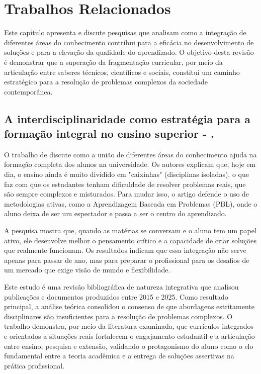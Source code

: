 \chapter{Trabalhos Relacionados}
\label{cap:trabalhos-relacionados}

Este capítulo apresenta e discute pesquisas que analisam como a integração de
diferentes áreas do conhecimento contribui para a eficácia no desenvolvimento
de soluções e para a elevação da qualidade do aprendizado. O objetivo desta
revisão é demonstrar que a superação da fragmentação curricular, por meio da
articulação entre saberes técnicos, científicos e sociais, constitui um caminho
estratégico para a resolução de problemas complexos da sociedade contemporânea.

\section{A interdisciplinaridade como estratégia para a formação integral no ensino
  superior - .
 }\label{sec:ribeiro-2025}

O trabalho de  discute como a união de diferentes
áreas do conhecimento ajuda na formação completa dos alunos na universidade. Os
autores explicam que, hoje em dia, o ensino ainda é muito dividido em
"caixinhas" (disciplinas isoladas), o que faz com que os estudantes tenham
dificuldade de resolver problemas reais, que são sempre complexos e misturados.
Para mudar isso, o artigo defende o uso de metodologias ativas, como a
Aprendizagem Baseada em Problemas (PBL), onde o aluno deixa de ser um
espectador e passa a ser o centro do aprendizado.

A pesquisa mostra que, quando as matérias se conversam e o aluno tem um papel
ativo, ele desenvolve melhor o pensamento crítico e a capacidade de criar
soluções que realmente funcionam. Os resultados indicam que essa integração não
serve apenas para passar de ano, mas para preparar o profissional para os
desafios de um mercado que exige visão de mundo e flexibilidade.

Este estudo é uma revisão bibliográfica de natureza integrativa que analisou
publicações e documentos produzidos entre 2015 e 2025. Como resultado
principal, a análise teórica consolidou o consenso de que abordagens
estritamente disciplinares são insuficientes para a resolução de problemas
complexos. O trabalho demonstra, por meio da literatura examinada, que
currículos integrados e orientados a situações reais fortalecem o engajamento
estudantil e a articulação entre ensino, pesquisa e extensão, validando o
protagonismo do aluno como o elo fundamental entre a teoria acadêmica e a
entrega de soluções assertivas na prática profissional.

